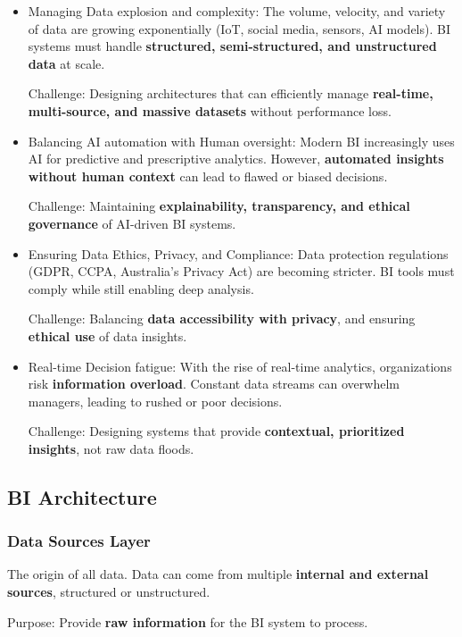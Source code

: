 \begin{itemize}
    \item Managing Data explosion and complexity: The volume, velocity, and variety of data are growing exponentially (IoT, social media, sensors, AI models). BI systems must handle \textbf{structured, semi-structured, and unstructured data} at scale.
        
        Challenge: Designing architectures that can efficiently manage \textbf{real-time, multi-source, and massive datasets} without performance loss.
    \item Balancing AI automation with Human oversight: Modern BI increasingly uses AI for predictive and prescriptive analytics. However, \textbf{automated insights without human context} can lead to flawed or biased decisions.
        
        Challenge: Maintaining \textbf{explainability, transparency, and ethical governance} of AI-driven BI systems.
    \item Ensuring Data Ethics, Privacy, and Compliance: Data protection regulations (GDPR, CCPA, Australia’s Privacy Act) are becoming stricter. BI tools must comply while still enabling deep analysis.
        
        Challenge: Balancing \textbf{data accessibility with privacy}, and ensuring \textbf{ethical use} of data insights.
    \item Real-time Decision fatigue: With the rise of real-time analytics, organizations risk \textbf{information overload}. Constant data streams can overwhelm managers, leading to rushed or poor decisions.
        
        Challenge: Designing systems that provide \textbf{contextual, prioritized insights}, not raw data floods.
\end{itemize}

\subsection{BI Architecture}

\subsubsection{Data Sources Layer}

\indent 

The origin of all data. Data can come from multiple \textbf{internal and external sources}, structured or unstructured.

Purpose: Provide \textbf{raw information} for the BI system to process.


